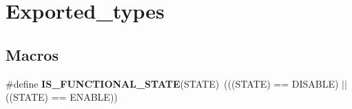 \hypertarget{group___exported__types}{\section{Exported\-\_\-types}
\label{group___exported__types}
}
\subsection*{Macros}
\begin{DoxyCompactItemize}
\item 
\hypertarget{group___exported__types_gaffaf7c3f537d7a3370b1bbdda67a2bf6}{\#define {\bfseries I\-S\-\_\-\-F\-U\-N\-C\-T\-I\-O\-N\-A\-L\-\_\-\-S\-T\-A\-T\-E}(S\-T\-A\-T\-E)~(((S\-T\-A\-T\-E) == D\-I\-S\-A\-B\-L\-E) $|$$|$ ((S\-T\-A\-T\-E) == E\-N\-A\-B\-L\-E))}\label{group___exported__types_gaffaf7c3f537d7a3370b1bbdda67a2bf6}

\end{DoxyCompactItemize}
